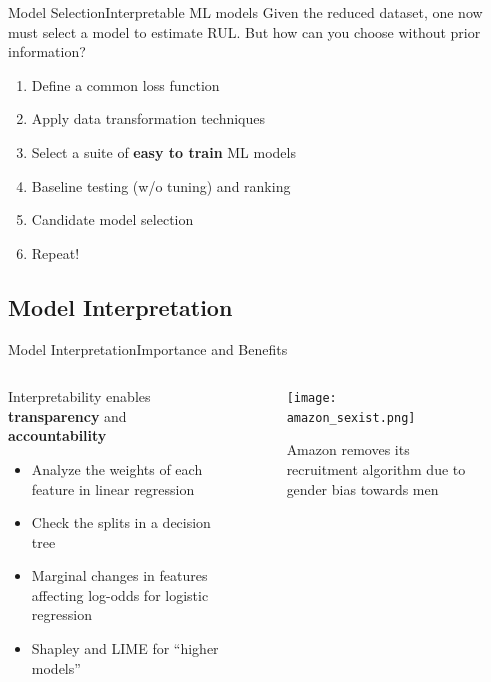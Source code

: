 \documentclass{beamer}
\begin{document}
            \begin{frame}{Model Selection}{Interpretable ML models}
                Given the reduced dataset, one now must select a model to estimate RUL. But how can you choose without prior information?
                \begin{enumerate}
                    \item Define a common loss function
                    \item Apply data transformation techniques
                    \item Select a suite of \textbf{easy to train} ML models
                    \item Baseline testing (w/o tuning) and ranking
                    \item Candidate model selection
                    \item Repeat!
                \end{enumerate}
            \end{frame}

        \subsection{Model Interpretation}
            \begin{frame}{Model Interpretation}{Importance and Benefits}

                \begin{columns}
                    \begin{column}{0.5\textwidth}
                        Interpretability enables \textbf{transparency} and \textbf{accountability}
                        \begin{itemize}
                            \item Analyze the weights of each feature in linear regression
                            \item Check the splits in a decision tree
                            \item Marginal changes in features affecting log-odds for logistic regression
                            \item Shapley and LIME for \enquote{higher models}
                        \end{itemize}
                    \end{column}
                    \begin{column}{0.5\textwidth}
                        \begin{figure}[!htbp]
                            \centering
                            \texttt{[image: amazon\_sexist.png]}
                            \caption{Amazon removes its recruitment algorithm due to gender bias towards men \cite{reporter-2018}}
                        \end{figure}
                    \end{column}
                \end{columns}
            \end{frame}
\end{document}
